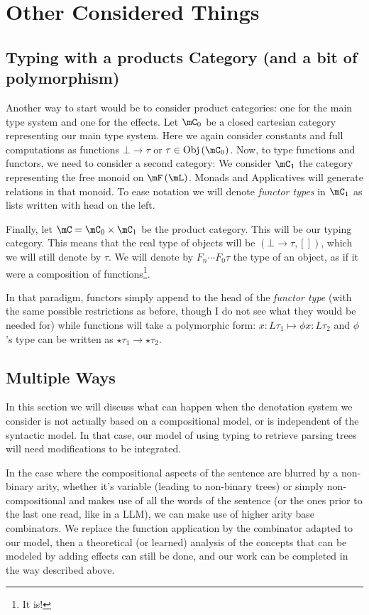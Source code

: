 \section{Other Considered Things}
\subsection{Typing with a products Category (and a bit of polymorphism)}
\label{app:prodcat}
Another way to start would be to consider product categories: one for the main type system and one for the effects.
Let $\mC_{0}$ be a closed cartesian category representing our main type system.
Here we again consider constants and full computations as functions $\bot \to \tau$ or $\tau \in \mathrm{Obj}\left( \mC_{0} \right)$.
Now, to type functions and functors, we need to consider a second category:
We consider $\mC_{1}$ the category representing the free monoid on $\mF\left( \mL \right)$.
Monads and Applicatives will generate relations in that monoid.
To ease notation we will denote \emph{functor types} in $\mC_{1}$ as lists written with head on the left.

Finally, let $\mC = \mC_{0} \times \mC_{1}$ be the product category. This will be our typing category.
This means that the real type of objects will be $\left( \bot \to \tau, [] \right)$, which we will still denote by $\tau$.
We will denote by $F_{n} \cdots F_{0} \tau$ the type of an object, as if it were a composition of functions\footnote{It is!}.

In that paradigm, functors simply append to the head of the \emph{functor type} (with the same possible restrictions as before, though I do not see what they would be needed for) while functions will take a polymorphic form:
$x: L\tau_{1} \mapsto \phi x: L\tau_{2}$ and $\phi$'s type can be written as $\star\tau_{1} \to \star\tau_{2}$.

\subsection{Multiple Ways}
\label{app:arities-and-denots}
In this section we will discuss what can happen when the denotation system
we consider is not actually based on a compositional model, or is independent
of the syntactic model.
In that case, our model of using typing to retrieve parsing trees will need
modifications to be integrated.

In the case where the compositional aspects of the sentence are blurred by a
non-binary arity, whether it's variable (leading to non-binary trees) or simply
non-compositional and makes use of all the words of the sentence (or the ones
prior to the last one read, like in a LLM), we can make use of higher arity
base combinators.
We replace the function application by the combinator adapted to our model,
then a theoretical (or learned) analysis of the concepts that can be modeled
by adding effects can still be done, and our work can be completed in the way
described above.

